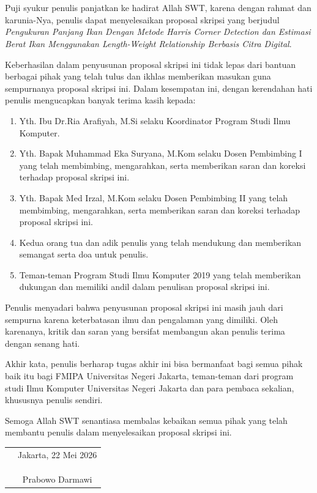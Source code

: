 \chapter*{}

Puji syukur penulis panjatkan ke hadirat Allah SWT, karena dengan rahmat dan
karunia-Nya, penulis dapat menyelesaikan proposal skripsi yang berjudul
\textit{Pengukuran Panjang Ikan Dengan Metode Harris Corner Detection dan Estimasi Berat Ikan Menggunakan Length-Weight Relationship Berbasis Citra Digital}.

Keberhasilan dalam penyusunan proposal skripsi ini tidak lepas dari bantuan
berbagai pihak yang telah tulus dan ikhlas memberikan masukan guna sempurnanya proposal skripsi ini. Dalam kesempatan ini, dengan
kerendahan hati penulis mengucapkan banyak terima kasih kepada:

\begin{enumerate}
	\item Yth. Ibu Dr.Ria Arafiyah, M.Si selaku Koordinator Program Studi Ilmu Komputer.
	\item Yth. Bapak Muhammad Eka Suryana, M.Kom selaku Dosen Pembimbing I yang telah membimbing, mengarahkan, serta memberikan saran dan koreksi terhadap proposal skripsi ini.
	\item Yth. Bapak Med Irzal, M.Kom selaku Dosen Pembimbing II yang telah membimbing, mengarahkan, serta memberikan saran dan koreksi terhadap proposal skripsi ini.
	\item Kedua orang tua dan adik penulis yang telah mendukung dan memberikan semangat serta doa untuk penulis.
	\item Teman-teman Program Studi Ilmu Komputer 2019 yang telah memberikan dukungan dan memiliki andil dalam penulisan proposal skripsi ini.
\end{enumerate}

Penulis menyadari bahwa penyusunan proposal skripsi ini masih jauh dari sempurna
karena keterbatasan ilmu dan pengalaman yang dimiliki. Oleh karenanya, kritik
dan saran yang bersifat membangun akan penulis terima dengan senang hati. 

Akhir kata, penulis berharap tugas akhir ini bisa bermanfaat bagi semua pihak baik itu bagi FMIPA Universitas Negeri Jakarta, teman-teman dari program studi Ilmu
Komputer Universitas Negeri Jakarta dan para pembaca sekalian, khususnya penulis sendiri.

Semoga Allah SWT senantiasa membalas kebaikan semua pihak yang telah membantu penulis dalam menyelesaikan proposal skripsi ini.

\vspace{2cm}

\begin{tabular}{p{7.5cm}c}
	&Jakarta, 22 Mei 2026 \\
	&\\
	&\\
	&\\
	&Prabowo Darmawi
\end{tabular}
